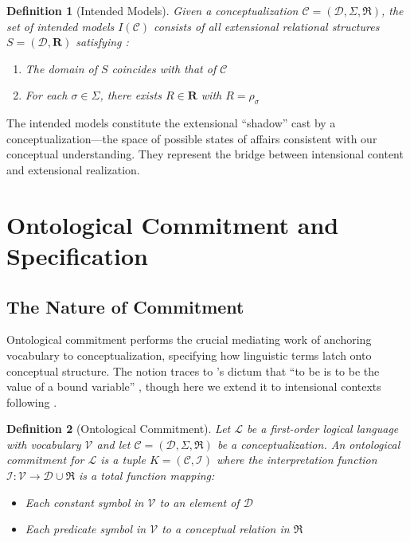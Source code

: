 \documentclass[11pt,a4paper]{article}
\newtheorem{definition}{Definition}[section]
\newcommand{\domain}{\mathcal{D}}
\newcommand{\vocab}{\mathcal{V}}
\newcommand{\lang}{\mathcal{L}}
\newcommand{\interp}{\mathcal{I}}
\newcommand{\concept}{\mathcal{C}}
\newcommand{\intrel}{\mathfrak{R}}
\begin{document}
\begin{definition}[Intended Models]
Given a conceptualization $\concept = (\domain, \Sigma, \intrel)$, the set of \emph{intended models} $I(\concept)$ consists of all extensional relational structures $S = (\domain, \mathbf{R})$ satisfying \citep[following][]{guarino2009}:
\begin{enumerate}
    \item The domain of $S$ coincides with that of $\concept$
    \item For each $\sigma \in \Sigma$, there exists $R \in \mathbf{R}$ with $R = \rho_\sigma$
\end{enumerate}
\end{definition}

The intended models constitute the extensional ``shadow'' cast by a conceptualization---the space of possible states of affairs consistent with our conceptual understanding. They represent the bridge between intensional content and extensional realization.

\section{Ontological Commitment and Specification}

\subsection{The Nature of Commitment}

Ontological commitment performs the crucial mediating work of anchoring vocabulary to conceptualization, specifying how linguistic terms latch onto conceptual structure. The notion traces to \citeauthor{quine1948}'s dictum that ``to be is to be the value of a bound variable'' \citep{quine1948}, though here we extend it to intensional contexts following \citet{guarino1998}.

\begin{definition}[Ontological Commitment]
Let $\lang$ be a first-order logical language with vocabulary $\vocab$ and let $\concept = (\domain, \Sigma, \intrel)$ be a conceptualization. An \emph{ontological commitment} for $\lang$ is a tuple $K = (\concept, \interp)$ where the \emph{interpretation function} $\interp : \vocab \to \domain \cup \intrel$ is a total function mapping:
\begin{itemize}
    \item Each constant symbol in $\vocab$ to an element of $\domain$
    \item Each predicate symbol in $\vocab$ to a conceptual relation in $\intrel$
\end{itemize}
\end{definition}
\end{document}
